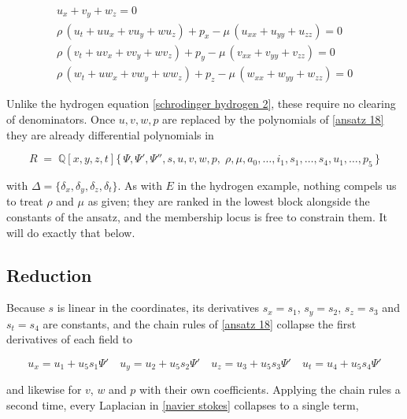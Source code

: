 \documentclass{article}
\theoremstyle{definition}
\theoremstyle{plain}
\begin{document}
\begin{nsexample}
\begin{subequations}
\label{navier stokes}
\begin{gather}
u_x + v_y + w_z = 0 \label{navier stokes:continuity} \\
\rho\,(u_t + u u_x + v u_y + w u_z) + p_x - \mu\,(u_{xx}+u_{yy}+u_{zz}) = 0 \label{navier stokes:x} \\
\rho\,(v_t + u v_x + v v_y + w v_z) + p_y - \mu\,(v_{xx}+v_{yy}+v_{zz}) = 0 \label{navier stokes:y} \\
\rho\,(w_t + u w_x + v w_y + w w_z) + p_z - \mu\,(w_{xx}+w_{yy}+w_{zz}) = 0 \label{navier stokes:z}
\end{gather}
\end{subequations}

Unlike the hydrogen equation \eqref{schrodinger hydrogen 2}, these require no
clearing of denominators.  Once $u,v,w,p$ are replaced by the polynomials of
\eqref{ansatz 18} they are already differential polynomials in

\begin{equation}
\label{eq:ns-ring}
R \;=\; \mathbb{Q}[x,y,z,t]\{\,\Psi, \Psi', \Psi'', s, u, v, w, p,\;
   \rho, \mu, a_0, \ldots, i_1, s_1, \ldots, s_4, u_1, \ldots, p_5 \,\}
\end{equation}

\noindent
with $\Delta = \{\delta_x, \delta_y, \delta_z, \delta_t\}$.  As with $E$ in the
hydrogen example, nothing compels us to treat $\rho$ and $\mu$ as given; they
are ranked in the lowest block alongside the constants of the ansatz, and the
membership locus is free to constrain them.  It will do exactly that below.

\subsection{Reduction}

Because $s$ is linear in the coordinates, its derivatives $s_x = s_1$,
$s_y = s_2$, $s_z = s_3$ and $s_t = s_4$ are constants, and the chain rules of
\eqref{ansatz 18} collapse the first derivatives of each field to

\begin{equation}
\label{ns first derivatives}
u_x = u_1 + u_5 s_1 \Psi' \quad
u_y = u_2 + u_5 s_2 \Psi' \quad
u_z = u_3 + u_5 s_3 \Psi' \quad
u_t = u_4 + u_5 s_4 \Psi'
\end{equation}

\noindent
and likewise for $v$, $w$ and $p$ with their own coefficients.  Applying the
chain rules a second time, every Laplacian in \eqref{navier stokes} collapses
to a single term,


\end{nsexample}
\end{document}
